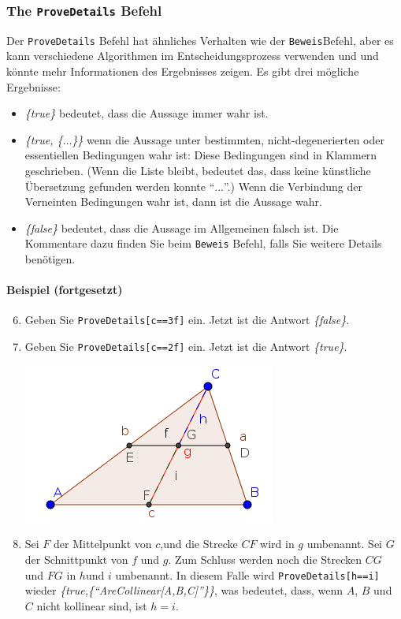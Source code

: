 \documentclass{article}
\begin{document}
\subsubsection{The \texttt{ProveDetails} Befehl}
Der \texttt{ProveDetails} Befehl hat ähnliches Verhalten wie der \texttt{Beweis}Befehl, aber es kann verschiedene Algorithmen im Entscheidungsprozess verwenden und und könnte mehr Informationen des Ergebnisses zeigen. Es gibt drei mögliche Ergebnisse:
\begin{itemize}
    \item \textit{\{true\}} bedeutet, dass die Aussage immer wahr ist.
    \item \textit{\{true, \{$\ldots$\}\}} wenn die Aussage unter bestimmten, nicht-degenerierten oder essentiellen Bedingungen wahr ist: Diese Bedingungen sind in Klammern geschrieben. (Wenn die Liste bleibt, bedeutet das, dass keine künstliche Übersetzung gefunden werden konnte ``$\ldots$''.) Wenn die Verbindung der Verneinten Bedingungen wahr ist, dann ist die Aussage wahr.
    \item \textit{\{false\}} bedeutet, dass die Aussage im Allgemeinen falsch ist. Die Kommentare dazu finden Sie beim \texttt{Beweis} Befehl, falls Sie weitere Details benötigen.
\end{itemize}
\paragraph{Beispiel (fortgesetzt)}
\begin{enumerate}
\setcounter{enumi}{5}
    \item Geben Sie \texttt{ProveDetails[c==3f]} ein. Jetzt ist die Antwort \textit{\{false\}}.
    \item Geben Sie \texttt{ProveDetails[c==2f]} ein. Jetzt ist die Antwort \textit{\{true\}}.
\begin{center}
\includegraphics[scale=0.5]{ProveDetails-example-1}
\end{center}
    \item Sei $F$ der Mittelpunkt von $c$,und die Strecke $CF$ wird in $g$ umbenannt. Sei $G$ der Schnittpunkt von $f$ und $g$. Zum Schluss werden noch die Strecken $CG$ und $FG$ in $h$und $i$ umbenannt. In diesem Falle wird \texttt{ProveDetails[h==i]} wieder \textit{\{true,\{``AreCollinear[A,B,C]''\}\}}, was bedeutet, dass, wenn $A$, $B$ und $C$ nicht kollinear sind, ist $h=i$.
\end{enumerate}
\end{document}
